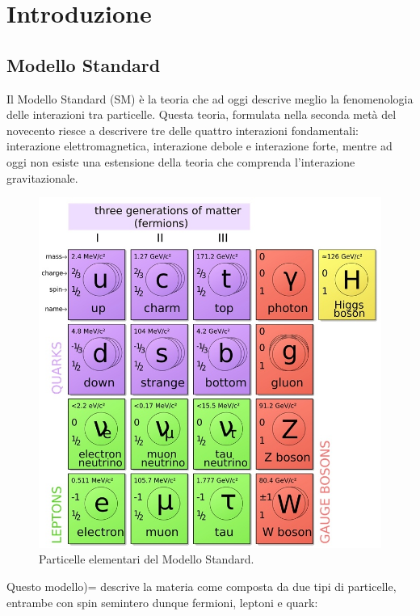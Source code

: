 \chapter{Introduzione}

\section{Modello Standard}
Il Modello Standard (SM) è la teoria che ad oggi descrive meglio la fenomenologia delle interazioni tra particelle. Questa teoria, formulata nella seconda metà del novecento riesce a descrivere tre delle quattro interazioni fondamentali: interazione elettromagnetica, interazione debole e interazione forte, mentre ad oggi non esiste una estensione della teoria che comprenda l'interazione gravitazionale.

\begin{figure}
\centering
\includegraphics[scale=0.3]{Immagini/SM}
\caption{Particelle elementari del Modello Standard.}
\label{fig:SM}
\end{figure}

Questo modello)= descrive la materia come composta da due tipi di particelle, entrambe con spin semintero dunque fermioni, leptoni e quark:

